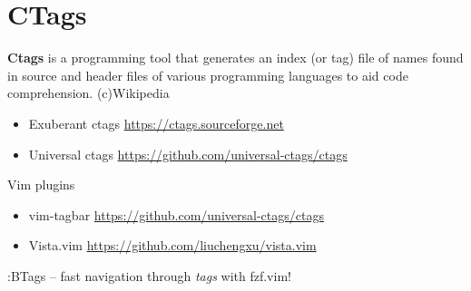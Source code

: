 \documentclass[aspectratio=169]{beamer}
\newcommand{\myurl}[1]{{\color{indigo}\url{#1}}}%
\begin{document}
\section*{CTags}
\begin{frame}{\secname}
  \textbf{Ctags} is a programming tool that generates an index (or tag) file of names found in source and header files of various programming languages to aid code comprehension. (c)Wikipedia
  \begin{itemize}

    \item Exuberant ctags \myurl{https://ctags.sourceforge.net}
    \item Universal ctags \myurl{https://github.com/universal-ctags/ctags}

  \end{itemize}

  \begin{block}{Vim plugins}
    \begin{itemize}
      \item vim-tagbar \myurl{https://github.com/universal-ctags/ctags}
      \item Vista.vim \myurl{https://github.com/liuchengxu/vista.vim}
    \end{itemize} 
  \end{block}
  :BTags -- fast navigation through \textit{tags} with fzf.vim!
  	
\end{frame}

\end{document}
